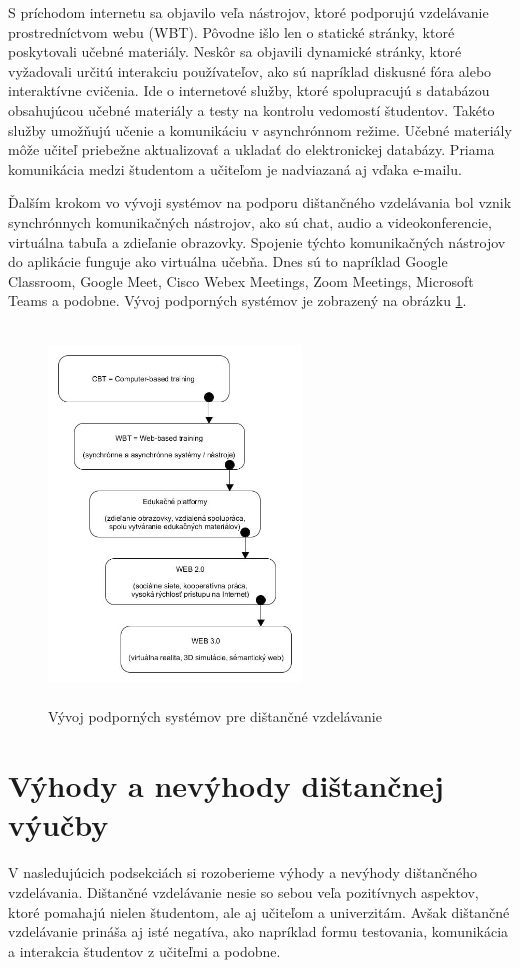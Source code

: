 \documentclass[10pt,oneside,slovak,a4paper]{article}
\begin{document}
S príchodom internetu sa objavilo veľa nástrojov, ktoré podporujú vzdelávanie prostredníctvom webu (WBT).
Pôvodne išlo len o statické stránky, ktoré poskytovali učebné materiály.
Neskôr sa objavili dynamické stránky, ktoré vyžadovali určitú interakciu používateľov, ako sú napríklad diskusné fóra alebo interaktívne cvičenia.
Ide o internetové služby, ktoré spolupracujú s databázou obsahujúcou učebné materiály a testy na kontrolu vedomostí študentov.
Takéto služby umožňujú učenie a komunikáciu v asynchrónnom režime. Učebné materiály môže učiteľ priebežne aktualizovať a ukladať do elektronickej databázy.
Priama komunikácia medzi študentom a učiteľom je nadviazaná aj vďaka e-mailu.

Ďalším krokom vo vývoji systémov na podporu dištančného vzdelávania bol vznik synchrónnych komunikačných nástrojov, ako sú chat, audio a videokonferencie, virtuálna tabuľa a zdieľanie obrazovky.
Spojenie týchto komunikačných nástrojov do aplikácie funguje ako virtuálna učebňa.
Dnes sú to napríklad Google Classroom, Google Meet, Cisco Webex Meetings, Zoom Meetings, Microsoft Teams a podobne.
Vývoj podporných systémov je zobrazený na obrázku \ref{Vyvoj_podp_sys_DE}.

\begin{figure}[h]
	\centering
	\includegraphics[scale=0.15, height=100mm,width=0.6\textwidth]{Dev_Of_SupSys_DE.jpg}
	\caption{Vývoj podporných systémov pre dištančné vzdelávanie\cite{WiktorzakKotowski}}
	\label{Vyvoj_podp_sys_DE}
\end{figure}

\section{Výhody a nevýhody dištančnej výučby}
V nasledujúcich podsekciách si rozoberieme výhody a nevýhody dištančného vzdelávania\cite{Sokolova2018}.
Dištančné vzdelávanie nesie so sebou veľa pozitívnych aspektov, ktoré pomahajú nielen študentom, ale aj učiteľom a univerzitám.
Avšak dištančné vzdelávanie prináša aj isté negatíva, ako napríklad formu testovania, komunikácia a interakcia študentov z učiteľmi a podobne. 
\end{document}
